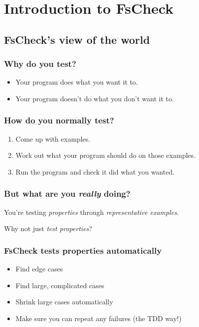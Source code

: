 \documentclass{beamer}
\begin{document}
\section{Introduction to FsCheck}
\subsection{FsCheck's view of the world}

\begin{frame}
\tableofcontents
\end{frame}

\begin{frame}
\frametitle{Why do you test?}

\begin{itemize}
    \item Your program does what you want it to.
    \item Your program doesn't do what you don't want it to.
\end{itemize}
\end{frame}

\begin{frame}
\frametitle{How do you normally test?}

\begin{enumerate}
    \item Come up with examples.
    \item Work out what your program should do on those examples.
    \item Run the program and check it did what you wanted.
\end{enumerate}
\end{frame}

\begin{frame}
\frametitle{But what are you \emph{really} doing?}

You're testing \emph{properties} through \emph{representative examples}.
\end{frame}

\begin{frame}
    Why not just \emph{test properties}?
\end{frame}

\begin{frame}
\frametitle{FsCheck tests properties automatically}

\begin{itemize}
    \item Find edge cases
    \item Find large, complicated cases
    \item Shrink large cases automatically
    \item Make sure you can repeat any failures (the TDD way!)
\end{itemize}
\end{frame}
\end{document}
